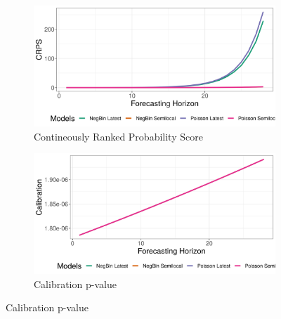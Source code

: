 \begin{figure}[H]
\begin{subfigure}{0.5\textwidth}
  \centering
  \includegraphics[width=\linewidth]{../output/Komanda_crps.png}  
  \caption{Contineously Ranked Probability Score}
  \label{Komanda_scores_1}
\end{subfigure}
\begin{subfigure}{0.5\textwidth}
  \centering
  \includegraphics[width=\linewidth]{../output/Komanda_calibration.png}  
  \caption{Calibration p-value}
  \label{Komanda_scores_2}
\end{subfigure}


\end{figure}
